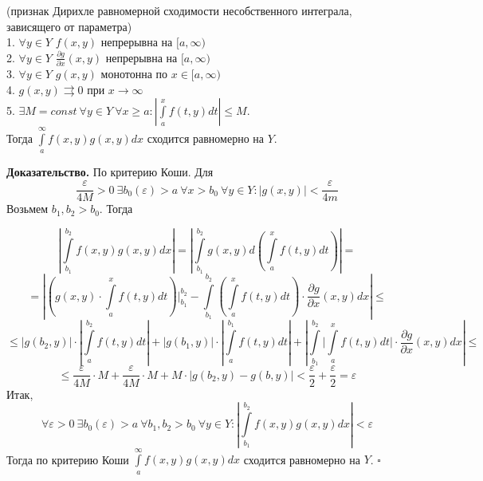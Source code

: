 \begin{theor}
    (признак Дирихле равномерной сходимости несобственного интеграла, 
    зависящего от параметра)\\
    1. $\forall y\in Y$ $f(x,y)$ непрерывна на  $[a,\infty)$\\
    2. $\forall y\in Y$ $\frac{\partial g}{\partial x}(x,y)$ 
    непрерывна на  $[a,\infty)$\\
    3. $\forall y\in Y$ $g(x,y)$ монотонна по $x\in [a,\infty)$\\
    4. $g(x,y)\rightrightarrows 0$ при $x\to \infty$\\
    5. $\exists M=const~\forall y\in Y~\forall x\geqslant a:
    \left| \int\limits_{a}^{x}f(t,y)dt \right|\leqslant M$.\\
    Тогда $\int\limits_{a}^{\infty}f(x,y)g(x,y)dx$ сходится равномерно на
    $Y$.
\end{theor}
\textbf{Доказательство.}  По критерию Коши. 
Для
$$\frac{\varepsilon}{4M}>0~\exists b_0(\varepsilon)>a~\forall x>b_0~
\forall y\in Y:|g(x,y)|<\frac{\varepsilon}{4m}$$ 
Возьмем $b_1,b_2>b_0$. Тогда

\begin{equation*}
\left| \int\limits_{b_1}^{b_2}f(x,y)g(x,y)dx \right| = 
\left| \int\limits_{b_1}^{b_2}g(x,y)d\left( \int\limits_{a}^{x}f(t,y)dt
\right)   \right| = 
\end{equation*}
$$=\left|\left( g(x,y)\cdot\int\limits_{a}^{x}f(t,y)dt\right)\bigg|^{b_2}_{b_1}
- \int\limits_{b_1}^{b_2} \left( \int\limits_{a}^{x} f(t,y)dt \right) \cdot 
\frac{\partial g}{\partial x} (x,y)dx \right|\leqslant$$
$$\leqslant 
\left| g(b_2,y) \right|\cdot \left| \int\limits_{a}^{b_2}f(t,y)dt \right| +
\left| g(b_1,y) \right|\cdot \left| \int\limits_{a}^{b_1}f(t,y)dt \right| +
\left| \int\limits_{b_1}^{b_2}\biggl| \int\limits_{a}^{x}f(t,y)dt\biggr|\cdot 
\frac{\partial g}{\partial x} (x,y)dx \right| \leqslant $$ 
$$\leqslant \frac{\varepsilon}{4M}\cdot M+\frac{\varepsilon}{4M}\cdot M+
M\cdot |g(b_2,y)-g(b,y)|<\frac{\varepsilon}{2}+\frac{\varepsilon}{2}=
\varepsilon$$ 
Итак, 
$$\forall \varepsilon>0~\exists b_0(\varepsilon)>a~\forall b_1,b_2>b_0~
\forall y\in Y:\left| \int\limits_{b_1}^{b_2}f(x,y)g(x,y)dx\right| 
<\varepsilon$$ 
Тогда по 
критерию Коши $\int\limits_{a}^{\infty}f(x,y)g(x,y)dx$ сходится равномерно на
$Y$. $\square$ 

